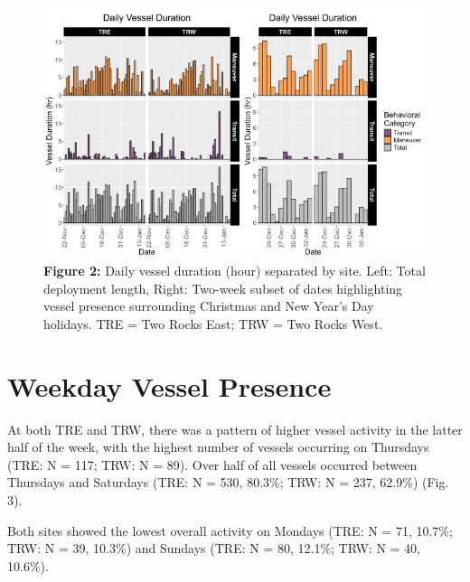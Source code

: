 \documentclass[
  letterpaper,
  oneside,
  open=any]{scrbook}
\begin{document}
\begin{figure}[H]

{\centering \includegraphics{images/Figure.2.PNG}

}

\caption{\textbf{Figure 2:} Daily vessel duration (hour) separated by
site. Left: Total deployment length, Right: Two-week subset of dates
highlighting vessel presence surrounding Christmas and New Year's Day
holidays. TRE = Two Rocks East; TRW = Two Rocks West.}

\end{figure}%

\section{Weekday Vessel Presence}\label{weekday-vessel-presence}

At both TRE and TRW, there was a pattern of higher vessel activity in
the latter half of the week, with the highest number of vessels
occurring on Thursdays (TRE: N = 117; TRW: N = 89). Over half of all
vessels occurred between Thursdays and Saturdays (TRE: N = 530, 80.3\%;
TRW: N = 237, 62.9\%) (Fig. 3).

Both sites showed the lowest overall activity on Mondays (TRE: N = 71,
10.7\%; TRW: N = 39, 10.3\%) and Sundays (TRE: N = 80, 12.1\%; TRW: N =
40, 10.6\%).
\end{document}
